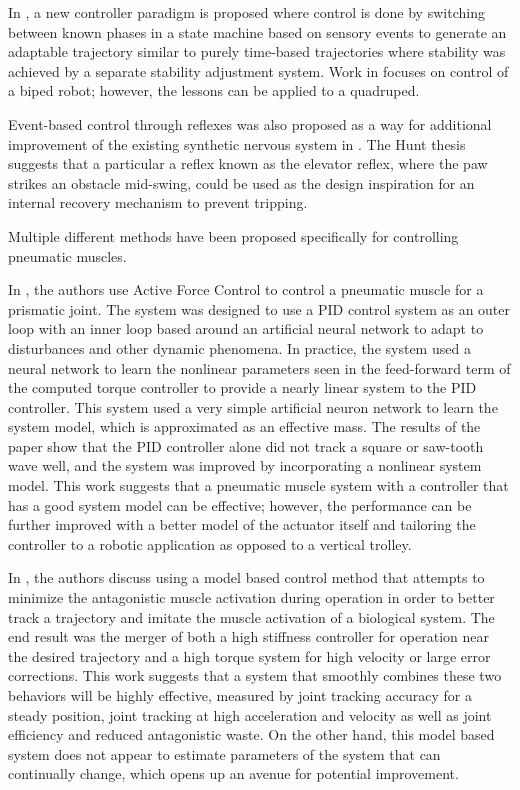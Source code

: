 
In \cite{EventBasedWalking}, a new controller paradigm is proposed where control
is done by switching between known phases in a state machine based on sensory
events to generate an adaptable trajectory similar to purely time-based
trajectories where stability was achieved by a separate stability adjustment
system. Work in \cite{EventBasedWalking} focuses on control of a biped robot; however, the lessons can
be applied to a quadruped.

Event-based control through reflexes was also proposed as a way for additional
improvement of the existing synthetic nervous system in \cite{HuntPhDThesis}.
The Hunt thesis \cite{HuntPhDThesis} suggests that a particular a reflex known as the elevator reflex,
where the paw strikes an
obstacle mid-swing, could be used as the design inspiration for an internal recovery
mechanism to prevent tripping.


Multiple different methods have been proposed specifically for controlling 
pneumatic muscles.

In \cite{Jahanabadi2009}, the authors use Active Force Control
to control a pneumatic muscle for a prismatic joint. The system was designed to
use a PID control system as an outer loop with an inner loop based around an
artificial neural network to adapt to disturbances and other dynamic phenomena.
In practice, the system used a neural network to learn the nonlinear parameters
seen in the feed-forward term of the computed torque controller to provide a
nearly linear system to the PID controller. This system used a very simple
artificial neuron network to learn the system model, which is approximated as an
effective mass. The results of the paper show that the PID controller alone did
not track a square or saw-tooth wave well, and the system was improved by
incorporating a nonlinear system model. This work suggests that a pneumatic 
muscle system with a controller that has a good system model can be effective; however, the performance can be further improved with a better model of the
actuator itself and tailoring the controller to a robotic application as opposed
to a vertical trolley.

In \cite{Wang2013}, the authors discuss using a model based control method that
attempts to minimize the antagonistic muscle activation during operation in
order to better track a trajectory and imitate the muscle activation of a
biological system. The end result was the merger of both a high stiffness 
controller for operation near the desired trajectory and a high torque system
for high velocity or large error corrections. This work suggests that a system 
that smoothly combines these two behaviors will be highly effective, measured by
joint tracking accuracy for a steady position, joint tracking at high 
acceleration and velocity as well as joint efficiency and reduced antagonistic
waste. On the other hand, this model based system does not appear to estimate
parameters of the system that can continually change, which opens up an avenue
for potential improvement.

